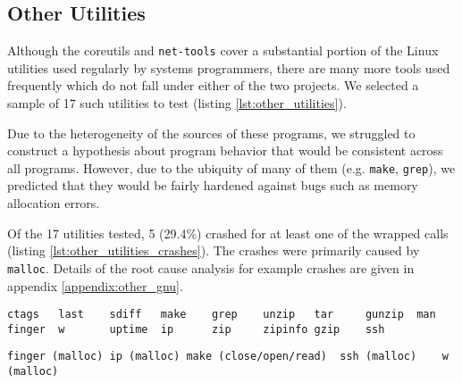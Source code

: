 \subsection{Other Utilities}
Although the coreutils and \texttt{net-tools} cover a substantial portion of the Linux utilities used regularly by systems programmers, there are many more tools used frequently which do not fall under either of the two projects. We selected a sample of 17 such utilities to test (listing \ref{lst:other_utilities}).

Due to the heterogeneity of the sources of these programs, we struggled to construct a hypothesis about program behavior that would be consistent across all programs. However, due to the ubiquity of many of them (e.g. \texttt{make}, \texttt{grep}), we predicted that they would be fairly hardened against bugs such as memory allocation errors.

Of the 17 utilities tested, 5 (29.4\%) crashed for at least one of the wrapped calls (listing \ref{lst:other_utilities_crashes}). The crashes were primarily caused by \texttt{malloc}. Details of the root cause analysis for example crashes are given in appendix \ref{appendix:other_gnu}.

\begin{lstlisting}[label={lst:other_utilities},caption={Other small-scale utilities tested}]
ctags   last    sdiff   make    grep    unzip   tar     gunzip  man
finger  w       uptime  ip      zip     zipinfo gzip    ssh
\end{lstlisting}

\begin{lstlisting}[label={lst:other_utilities_crashes},caption={Crashes in other GNU utilities}]
finger (malloc)	ip (malloc)	make (close/open/read)	ssh (malloc)	w (malloc)
\end{lstlisting}
